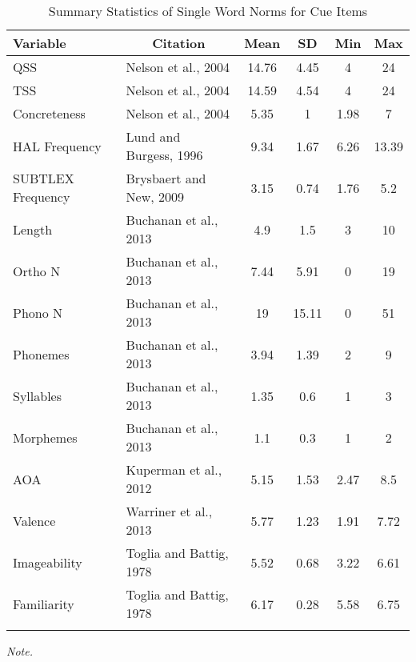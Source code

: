 \documentclass[english,man]{apa6}
\theoremstyle{definition}
\theoremstyle{definition}
\theoremstyle{remark}
\begin{document}
\begin{table}[tbp]
\begin{center}
\begin{threeparttable}
\caption{\label{tab:unnamed-chunk-2}Summary Statistics of Single Word Norms for Cue Items}
\begin{tabular}{llcccc}
\toprule
Variable & \multicolumn{1}{c}{Citation} & \multicolumn{1}{c}{Mean} & \multicolumn{1}{c}{SD} & \multicolumn{1}{c}{Min} & \multicolumn{1}{c}{Max}\\
\midrule
QSS & Nelson et al., 2004 & 14.76 & 4.45 & 4 & 24\\
TSS & Nelson et al., 2004 & 14.59 & 4.54 & 4 & 24\\
Concreteness & Nelson et al., 2004 & 5.35 & 1 & 1.98 & 7\\
HAL Frequency & Lund and Burgess, 1996 & 9.34 & 1.67 & 6.26 & 13.39\\
SUBTLEX Frequency & Brysbaert and New, 2009 & 3.15 & 0.74 & 1.76 & 5.2\\
Length & Buchanan et al., 2013 & 4.9 & 1.5 & 3 & 10\\
Ortho N & Buchanan et al., 2013 & 7.44 & 5.91 & 0 & 19\\
Phono N & Buchanan et al., 2013 & 19 & 15.11 & 0 & 51\\
Phonemes & Buchanan et al., 2013 & 3.94 & 1.39 & 2 & 9\\
Syllables & Buchanan et al., 2013 & 1.35 & 0.6 & 1 & 3\\
Morphemes & Buchanan et al., 2013 & 1.1 & 0.3 & 1 & 2\\
AOA & Kuperman et al., 2012 & 5.15 & 1.53 & 2.47 & 8.5\\
Valence & Warriner et al., 2013 & 5.77 & 1.23 & 1.91 & 7.72\\
Imageability & Toglia and Battig, 1978 & 5.52 & 0.68 & 3.22 & 6.61\\
Familiarity & Toglia and Battig, 1978 & 6.17 & 0.28 & 5.58 & 6.75\\
\bottomrule
\addlinespace
\end{tabular}
\begin{tablenotes}[para]
\textit{Note.} 
\end{tablenotes}
\end{threeparttable}
\end{center}
\end{table}
\end{document}
